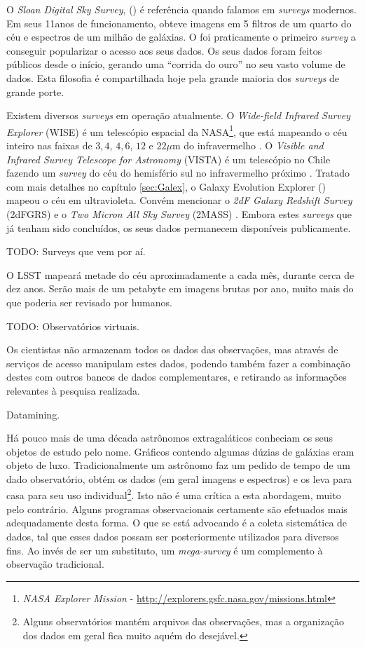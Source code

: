 O {\em Sloan Digital Sky Survey}, (\SDSS) \citep{York2000} é referência quando
falamos em {\em surveys} modernos. Em seus 11\fixme anos de funcionamento,
obteve imagens em 5 filtros de um quarto do céu e espectros de um milhão de
galáxias. O \SDSS foi praticamente o primeiro {\em survey} a conseguir
popularizar o acesso aos seus dados. Os seus dados foram feitos públicos
desde o início\citneed, gerando uma ``corrida do ouro'' no seu vasto volume de
dados. Esta filosofia é compartilhada hoje pela grande maioria dos {\em
surveys} de grande porte.

Existem diversos {\em surveys} em operação atualmente. O {\em Wide-field
Infrared Survey Explorer} (WISE) é um telescópio espacial da NASA\footnote{{\em
NASA Explorer Mission} - \url{http://explorers.gsfc.nasa.gov/missions.html}},
que está mapeando o céu inteiro nas faixas de $3,4$, $4,6$, $12$ e $22\mu$m do
infravermelho \citep{Wright2010}. O {\em Visible and Infrared Survey Telescope
for Astronomy} (VISTA) é um telescópio no Chile fazendo um {\em survey} do céu
do hemisfério sul no infravermelho próximo \citep{Born2010}. Tratado com mais
detalhes no capítulo \ref{sec:Galex}, o {Galaxy Evolution Explorer} (\galex)
mapeou o céu em ultravioleta. Convém mencionar o {\em 2dF Galaxy Redshift
Survey} (2dFGRS) \citep{Colless1999} e o {\em Two Micron All Sky Survey} (2MASS)
\citep{Skrutskie2006}. Embora estes {\em surveys} que já tenham sido
concluídos, os seus dados permanecem disponíveis publicamente.

TODO: Surveys que vem por aí.

O LSST mapeará metade do céu aproximadamente a cada mês, durante cerca de dez
anos. Serão mais de um petabyte em imagens brutas por ano, muito mais do que
poderia ser revisado por humanos.


TODO: Observatórios virtuais.

Os cientistas não armazenam todos os dados das
observações, mas através de serviços de acesso manipulam estes dados, podendo
também fazer a combinação destes com outros bancos de dados complementares, e
retirando as informações relevantes à pesquisa realizada.


Datamining.

Há pouco mais de uma década astrônomos extragaláticos conheciam os seus objetos
de estudo pelo nome. Gráficos contendo algumas dúzias de galáxias eram objeto de
luxo. Tradicionalmente um astrônomo faz um pedido de tempo de um dado
observatório, obtém os dados (em geral imagens e espectros) e os leva para casa
para seu uso individual\footnote{Alguns observatórios mantém arquivos das
observações\citneed, mas a organização dos dados em geral fica muito aquém do
desejável.}. Isto não é uma crítica a esta abordagem, muito pelo contrário.
Alguns programas observacionais certamente são efetuados mais adequadamente
desta forma. O que se está advocando é a coleta sistemática de dados, tal que
esses dados possam ser posteriormente utilizados para diversos fins. Ao invés de
ser um substituto, um {\em mega-survey} é um complemento à observação
tradicional.


